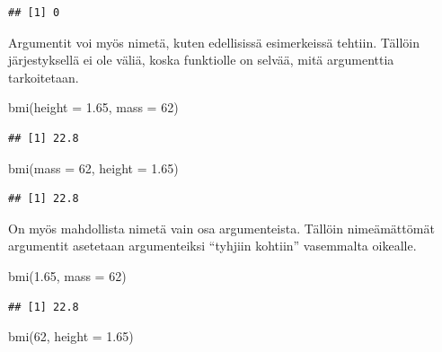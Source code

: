 \documentclass[
]{book}
\newenvironment{Shaded}{\begin{snugshade}}{\end{snugshade}}
\newcommand{\AttributeTok}[1]{\textcolor[rgb]{0.77,0.63,0.00}{#1}}
\newcommand{\DecValTok}[1]{\textcolor[rgb]{0.00,0.00,0.81}{#1}}
\newcommand{\FloatTok}[1]{\textcolor[rgb]{0.00,0.00,0.81}{#1}}
\newcommand{\FunctionTok}[1]{\textcolor[rgb]{0.00,0.00,0.00}{#1}}
\newcommand{\NormalTok}[1]{#1}
\begin{document}
\begin{verbatim}
## [1] 0
\end{verbatim}

Argumentit voi myös nimetä, kuten edellisissä esimerkeissä tehtiin. Tällöin järjestyksellä ei ole väliä, koska funktiolle on selvää, mitä argumenttia tarkoitetaan.

\begin{Shaded}
\begin{Highlighting}[]
\FunctionTok{bmi}\NormalTok{(}\AttributeTok{height =} \FloatTok{1.65}\NormalTok{, }\AttributeTok{mass =} \DecValTok{62}\NormalTok{)}
\end{Highlighting}
\end{Shaded}

\begin{verbatim}
## [1] 22.8
\end{verbatim}

\begin{Shaded}
\begin{Highlighting}[]
\FunctionTok{bmi}\NormalTok{(}\AttributeTok{mass =} \DecValTok{62}\NormalTok{, }\AttributeTok{height =} \FloatTok{1.65}\NormalTok{)}
\end{Highlighting}
\end{Shaded}

\begin{verbatim}
## [1] 22.8
\end{verbatim}

On myös mahdollista nimetä vain osa argumenteista. Tällöin nimeämättömät argumentit asetetaan argumenteiksi ``tyhjiin kohtiin'' vasemmalta oikealle.

\begin{Shaded}
\begin{Highlighting}[]
\FunctionTok{bmi}\NormalTok{(}\FloatTok{1.65}\NormalTok{, }\AttributeTok{mass =} \DecValTok{62}\NormalTok{)}
\end{Highlighting}
\end{Shaded}

\begin{verbatim}
## [1] 22.8
\end{verbatim}

\begin{Shaded}
\begin{Highlighting}[]
\FunctionTok{bmi}\NormalTok{(}\DecValTok{62}\NormalTok{, }\AttributeTok{height =} \FloatTok{1.65}\NormalTok{)}
\end{Highlighting}
\end{Shaded}
\end{document}
